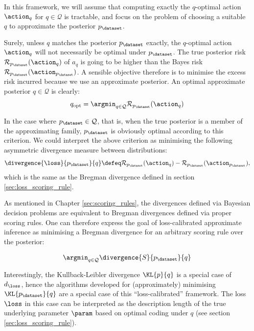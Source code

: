 In this framework, we will assume that computing exactly the $q$-optimal action $\action_q$ for $q \in \mathcal{Q}$ is tractable, and focus on the problem of choosing a suitable $q$ to approximate the posterior $p_\dataset$.

Surely, unless $q$ matches the posterior $p_\dataset$ exactly, the $q$-optimal action $\action_q$ will not necessarily be optimal under $p_\dataset$. The true posterior risk $\mathcal{R}_{p_\dataset}(\action_q)$ of $a_q$ is going to be higher than the Bayes risk $\mathcal{R}_{p_\dataset}(\action_{p_\dataset})$. A sensible objective therefore is to minimise the excess risk incurred because we use an approximate posterior. An optimal approximate posterior $q \in \mathcal{Q}$ is clearly:
\begin{equation}
	q_\mathrm{opt} = \argmin_{q \in \mathcal{Q}} \mathcal{R}_{p_\dataset}(\action_q)
\end{equation}

In the case where $p_\dataset\in\mathcal{Q}$, that is, when the true posterior is a member of the approximating family, $p_\dataset$ is obviously optimal according to this criterion. We could interpret the above criterion as minimising the following asymmetric divergence measure between distributions:
\begin{equation} \label{e:d_L}
	\divergence{\loss}{p_\dataset}{q} \defeq \mathcal{R}_{p_{\dataset}}(\action_q) - \mathcal{R}_{p_\dataset}(\action_{p_\dataset}),
\end{equation}
which is the same as the Bregman divergence defined in section \ref{sec:loss_scoring_rule}.

As mentioned in Chapter \ref{sec:scoring_rules}, the divergences defined via Bayesian decision problems are equivalent to Bregman divergences defined via proper scoring rules. One can therefore express the goal of loss-calibrated approximate inference as minimising a Bregman divergence for an arbitrary scoring rule over the posterior:

\begin{equation}
	\argmin_{q \in \mathcal{Q}} \divergence{S}{p_{\dataset}}{q}
\end{equation}

Interestingly, the Kullback-Leibler divergence $\KL{p}{q}$ is a special case of $d_\loss$, hence the algorithms developed for (approximately) minimising  $\KL{p_\dataset}{q}$ are a special case of this ``loss-calibrated'' framework. The loss $\loss$ in this case can be interpreted as the description length of the true underlying parameter $\param$ based on optimal coding under $q$ (see section \ref{sec:loss_scoring_rule}).

